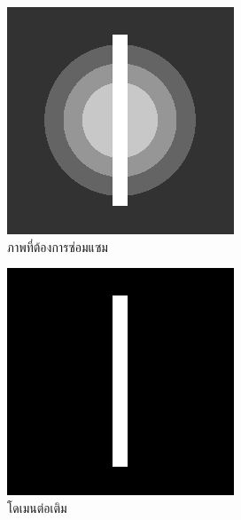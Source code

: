 \begin{figure}[H]
	\centering
	\begin{subfigure}{0.3\linewidth}
		\centering
		\includegraphics[width=0.8\linewidth]{image/grayscale_inpaint/toinpaint.png}
		\caption{ภาพที่ต้องการซ่อมแซม}
	\end{subfigure}
	\begin{subfigure}{0.3\linewidth}
		\centering
		\includegraphics[width=0.8\linewidth]{image/grayscale_inpaint/inpaintdomain.png}
		\caption{โดเมนต่อเติม}
	\end{subfigure}
	\begin{subfigure}{0.3\linewidth}

\end{subfigure}
\end{figure}
